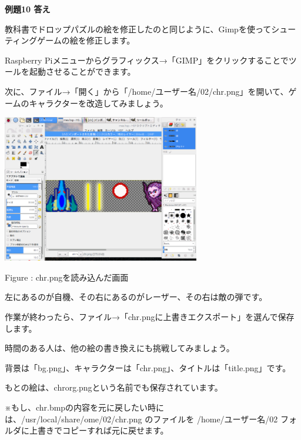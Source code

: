 \documentclass[a4paper,12pt]{jarticle}
\newcounter{Figure}
\renewcommand\theFigure{\arabic{Figure}}
\begin{document}
\bigskip

\bigskip

{\bfseries
例題10 答え}


\bigskip

教科書でドロップパズルの絵を修正したのと同じように、Gimpを使ってシューティングゲームの絵を修正します。


\bigskip

Raspberry Piメニューからグラフィックス→「GIMP」をクリックすることでツールを起動させることができます。

次に、ファイル→「開く」から「/home/ユーザー名/02/chr.png」を開いて、ゲームのキャラクターを改造してみましょう。

\bigskip
\bigskip

\begin{minipage}{9.781cm}
\centering
{\upshape
\includegraphics[keepaspectratio,width=8.625cm,height=6.459cm]{text02-img/text02-img042.png}
\flushleft

Figure \stepcounter{Figure}{\theFigure}: chr.pngを読み込んだ画面}
\end{minipage}

\bigskip
\bigskip
\bigskip

左にあるのが自機、その右にあるのがレーザー、その右は敵の弾です。

作業が終わったら、ファイル→「chr.pngに上書きエクスポート」を選んで保存します。


\bigskip

時間のある人は、他の絵の書き換えにも挑戦してみましょう。

背景は「bg.png」、キャラクターは「chr.png」、タイトルは「title.png」です。

もとの絵は、chrorg.pngという名前でも保存されています。

\bigskip

※もし、chr.bmpの内容を元に戻したい時には、/usr/local/share/ome/02/chr.png のファイルを /home/ユーザー名/02 フォルダに上書きでコピーすれば元に戻せます。
\end{document}
